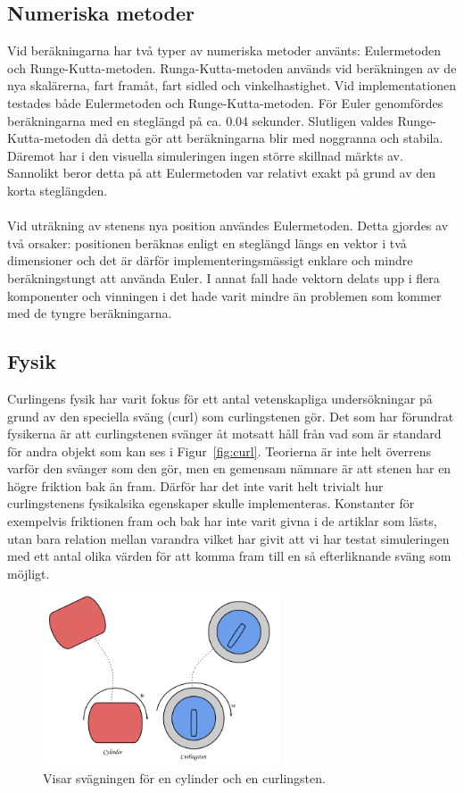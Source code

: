 \documentclass[11pt]{article} %
\begin{document}
\subsection{Numeriska metoder}
Vid beräkningarna har två typer av numeriska metoder använts: Eulermetoden och Runge-Kutta-metoden. Runga-Kutta-metoden används vid beräkningen av de nya skalärerna, fart framåt, fart sidled och vinkelhastighet.
Vid implementationen testades både Eulermetoden och Runge-Kutta-metoden. 
För Euler genomfördes beräkningarna med en steglängd på ca. 0.04 sekunder. 
Slutligen valdes Runge-Kutta-metoden då detta gör att beräkningarna blir med noggranna och stabila. 
Däremot har i den visuella simuleringen ingen större skillnad märkts av. Sannolikt beror detta på att Eulermetoden var relativt exakt på grund av den korta steglängden. 
\\\\Vid uträkning av stenens nya position användes Eulermetoden. 
Detta gjordes av två orsaker: positionen beräknas enligt en steglängd längs en vektor i två dimensioner och det är därför implementeringsmässigt enklare och mindre beräkningstungt att använda Euler. 
I annat fall hade vektorn delats upp i flera komponenter och vinningen i det hade varit mindre än problemen som kommer med de tyngre beräkningarna. 

\subsection{Fysik}
Curlingens fysik har varit fokus för ett antal vetenskapliga undersökningar på grund av den speciella sväng (curl) som curlingstenen gör. Det som har förundrat fysikerna är att curlingstenen svänger åt motsatt håll från vad som är standard för andra objekt som kan ses i Figur~\ref{fig:curl}. Teorierna är inte helt överrens varför den svänger som den gör, men en gemensam nämnare är att stenen har en högre friktion bak än fram. Därför har det inte varit helt trivialt hur curlingstenens fysikalsika egenskaper skulle implementeras. Konstanter för exempelvis friktionen fram och bak har inte varit givna i de artiklar som lästs, utan bara relation mellan varandra vilket har givit att vi har testat simuleringen med ett antal olika värden för att komma fram till en så efterliknande sväng som möjligt.

\begin{figure}[ht!]
\centering
\includegraphics[width=70mm]{curl.png}
\caption{Visar svägningen för en cylinder och en curlingsten. }
\label{fig:curl}
\label{overflow}
\end{figure}
\end{document}
